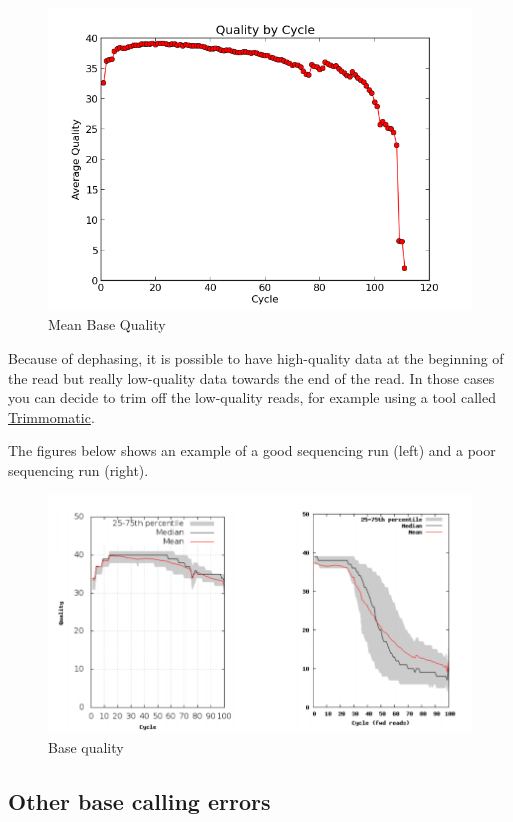 \documentclass[11pt]{article}
\begin{document}
    \begin{figure}
\centering
\includegraphics{img/base_qual.png}
\caption{Mean Base Quality}
\end{figure}

    Because of dephasing, it is possible to have high-quality data at the
beginning of the read but really low-quality data towards the end of the
read. In those cases you can decide to trim off the low-quality reads,
for example using a tool called
\href{http://www.usadellab.org/cms/?page=trimmomatic}{Trimmomatic}.

The figures below shows an example of a good sequencing run (left) and a
poor sequencing run (right).

    \begin{figure}
\centering
\includegraphics{img/base_qual_comparison.png}
\caption{Base quality}
\end{figure}

    \hypertarget{other-base-calling-errors}{%
\subsection{Other base calling errors}\label{other-base-calling-errors}}
\end{document}
